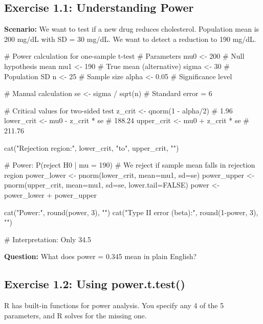 \documentclass[11pt]{article}
\begin{document}
\subsection{Exercise 1.1: Understanding Power}

\textbf{Scenario:} We want to test if a new drug reduces cholesterol. Population mean is 200 mg/dL with SD = 30 mg/dL. We want to detect a reduction to 190 mg/dL.

\begin{rcode}
# Power calculation for one-sample t-test
# Parameters
mu0 <- 200          # Null hypothesis mean
mu1 <- 190          # True mean (alternative)
sigma <- 30         # Population SD
n <- 25             # Sample size
alpha <- 0.05       # Significance level

# Manual calculation
se <- sigma / sqrt(n)  # Standard error = 6

# Critical values for two-sided test
z_crit <- qnorm(1 - alpha/2)  # 1.96
lower_crit <- mu0 - z_crit * se  # 188.24
upper_crit <- mu0 + z_crit * se  # 211.76

cat("Rejection region:", lower_crit, "to", upper_crit, "\n")

# Power: P(reject H0 | mu = 190)
# We reject if sample mean falls in rejection region
power_lower <- pnorm(lower_crit, mean=mu1, sd=se)
power_upper <- pnorm(upper_crit, mean=mu1, sd=se,
                     lower.tail=FALSE)
power <- power_lower + power_upper

cat("Power:", round(power, 3), "\n")
cat("Type II error (beta):", round(1-power, 3), "\n")

# Interpretation: Only 34.5%
\end{rcode}

\textbf{Question:} What does power = 0.345 mean in plain English?

\vspace{1.5cm}

\subsection{Exercise 1.2: Using power.t.test()}

R has built-in functions for power analysis. You specify any 4 of the 5 parameters, and R solves for the missing one.
\end{document}
